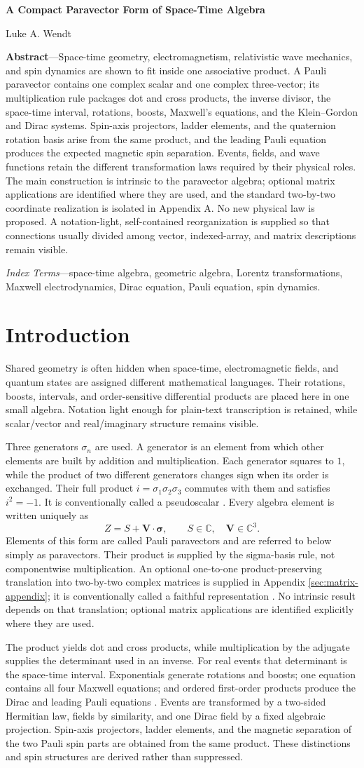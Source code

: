 \documentclass[10pt,letterpaper]{article}
\newcommand{\C}{\mathbb{C}}
\newcommand{\pv}[1]{#1}
\newcommand{\vct}[1]{\mathbf{#1}}
\newcommand{\sigv}{\vct{\pv{\bm{\sigma}}}}
\newcommand{\STATitle}{A Compact Paravector Form of Space-Time Algebra}
\newcommand{\STAAuthor}{Luke A. Wendt}
\newcommand{\STAAbstractText}{Space-time geometry, electromagnetism, relativistic wave mechanics, and spin dynamics are shown to fit inside one associative product. A Pauli paravector contains one complex scalar and one complex three-vector; its multiplication rule packages dot and cross products, the inverse divisor, the space-time interval, rotations, boosts, Maxwell's equations, and the Klein--Gordon and Dirac systems. Spin-axis projectors, ladder elements, and the quaternion rotation basis arise from the same product, and the leading Pauli equation produces the expected magnetic spin separation. Events, fields, and wave functions retain the different transformation laws required by their physical roles. The main construction is intrinsic to the paravector algebra; optional matrix applications are identified where they are used, and the standard two-by-two coordinate realization is isolated in Appendix A. No new physical law is proposed. A notation-light, self-contained reorganization is supplied so that connections usually divided among vector, indexed-array, and matrix descriptions remain visible.}
\newcommand{\STAIndexTerms}{space-time algebra, geometric algebra, Lorentz transformations, Maxwell electrodynamics, Dirac equation, Pauli equation, spin dynamics}
\newcommand{\STAMakeTitleBlock}{%
  \begin{center}
  {\LARGE\bfseries \STATitle \par}
  \vspace{0.55em}
  {\normalsize \STAAuthor \par}
  \end{center}
  \vspace{0.55em}
  \noindent\textbf{Abstract}---\STAAbstractText
  \par\vspace{0.35em}
  \noindent\textit{Index Terms}---\STAIndexTerms.
  \par\vspace{0.7em}
}
\begin{document}
\STAMakeTitleBlock
\thispagestyle{plain}

\section*{Introduction}\label{sec:orientation}
\begingroup
\setlength{\abovedisplayskip}{5pt plus 1pt minus 1pt}
\setlength{\belowdisplayskip}{5pt plus 1pt minus 1pt}
\setlength{\abovedisplayshortskip}{3pt plus 1pt}
\setlength{\belowdisplayshortskip}{4pt plus 1pt minus 1pt}
Shared geometry is often hidden when space-time, electromagnetic fields, and
quantum states are assigned different mathematical languages. Their
rotations, boosts, intervals, and order-sensitive differential products are
placed here in one small algebra. Notation light enough for plain-text
transcription is retained, while scalar/vector and real/imaginary structure
remains visible.

Three generators \(\pv{\sigma}_n\) are used. A generator is an element from
which other elements are built by addition and multiplication. Each
generator squares to \(1\), while the product of two different generators
changes sign when its order is exchanged. Their full product
\(i=\pv{\sigma}_1\pv{\sigma}_2\pv{\sigma}_3\) commutes with them and satisfies
\(i^2=-1\). It is conventionally called a pseudoscalar
\cite{hestenes1966,doran2003}. Every algebra element is written uniquely as
\[
\pv{Z}=S+\vct{V}\cdot\sigv,
\qquad S\in\C,\quad \vct{V}\in\C^3.
\]
Elements of this form are called Pauli paravectors and are referred to below
simply as paravectors. Their product is supplied by the sigma-basis rule,
not componentwise multiplication. An optional one-to-one
product-preserving translation into two-by-two complex matrices is supplied
in Appendix \ref{sec:matrix-appendix}; it is conventionally called a faithful
representation \cite{hestenes1966,baylis1999,doran2003}. No intrinsic result
depends on that translation; optional matrix applications are identified
explicitly where they are used.

The product yields dot and cross products, while multiplication by the
adjugate supplies the determinant used in an inverse. For real events that
determinant is the space-time interval. Exponentials generate rotations and
boosts; one equation contains all four Maxwell equations; and ordered
first-order products produce the Dirac and leading Pauli equations
\cite{lorentz1904,maxwell1865,dirac1928,pauli1927}. Events are transformed by
a two-sided Hermitian law, fields by similarity, and one Dirac field by a
fixed algebraic projection. Spin-axis projectors, ladder elements, and the
magnetic separation of the two Pauli spin parts are obtained from the same
product. These distinctions and spin structures are derived rather than
suppressed.
\end{document}
